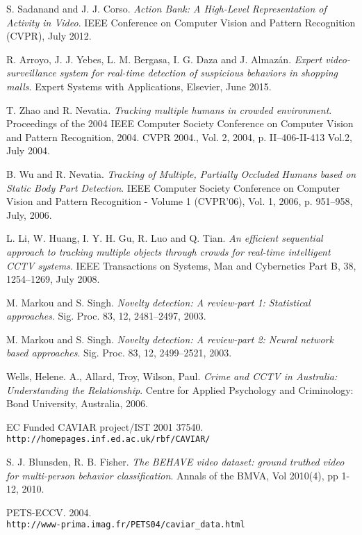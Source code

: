 \begin{thebibliography}{20}
S. Sadanand and J. J. Corso.
\textit{Action Bank: A High-Level Representation of Activity in Video}. 
IEEE Conference on Computer Vision and Pattern Recognition (CVPR), July 2012. 

R. Arroyo, J. J. Yebes, L. M. Bergasa, I. G. Daza and J. Almazán.
\textit{Expert video-surveillance system for real-time detection of suspicious behaviors in shopping malls}. 
Expert Systems with Applications, Elsevier, June 2015.

T. Zhao and R. Nevatia.
\textit{Tracking multiple humans in crowded environment}. 
Proceedings of the 2004 IEEE Computer Society Conference on Computer Vision and Pattern Recognition, 2004. CVPR 2004., Vol. 2, 2004, p. II–406-II-413 Vol.2, July 2004.

B. Wu and R. Nevatia.
\textit{Tracking of Multiple, Partially Occluded Humans based on Static Body Part Detection}. 
IEEE Computer Society Conference on Computer Vision and Pattern Recognition - Volume 1 (CVPR'06), Vol. 1, 2006, p. 951–958, July, 2006.

L. Li, W. Huang, I. Y. H. Gu, R. Luo and Q. Tian.
\textit{An efficient sequential approach to tracking multiple objects through crowds for real-time intelligent CCTV systems}. 
IEEE Transactions on Systems, Man and Cybernetics Part B, 38, 1254–1269, July 2008.

M. Markou and S. Singh.
\textit{Novelty detection: A review-part 1: Statistical approaches}. 
Sig. Proc. 83, 12, 2481–2497, 2003.

M. Markou and S. Singh.
\textit{Novelty detection: A review-part 2: Neural network based approaches}. 
Sig. Proc. 83, 12, 2499–2521, 2003.

Wells, Helene. A., Allard, Troy, Wilson, Paul.
\textit{Crime and CCTV in Australia: Understanding the Relationship}. 
Centre for Applied Psychology and Criminology: Bond University, Australia, 2006.

EC Funded CAVIAR project/IST 2001 37540.
\\\texttt{http://homepages.inf.ed.ac.uk/rbf/CAVIAR/}

S. J. Blunsden, R. B. Fisher.
\textit{The BEHAVE video dataset: ground truthed video for multi-person behavior classification}. 
Annals of the BMVA, Vol 2010(4), pp 1-12, 2010.

PETS-ECCV. 2004.
\\\texttt{http://www-prima.imag.fr/PETS04/caviar\_data.html}


\end{thebibliography}
